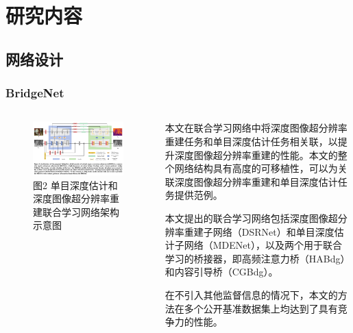 \documentclass[aspectratio=169,12pt]{beamer}
\begin{document}
\section{研究内容}
\subsection{网络设计}
\begin{frame}[t]
	\frametitle{BridgeNet}
	\begin{columns}
		\begin{column}{.50\linewidth}
			\begin{figure}
				\centering
				\includegraphics[scale=0.23]{13.png}
				\caption{\small \color{captiongray}图2 单目深度估计和深度图像超分辨率重建联合学习网络架构示意图}
			\end{figure}
		\end{column}
		\begin{column}{.50\linewidth}
			\begin{itemize}
			{\footnotesize
				\item 本文在{\color{red}联合学习网络}中将深度图像超分辨率重建任务和单目深度估计任务相关联，以提升深度图像超分辨率重建的性能。本文的整个网络结构具有高度的可移植性，可以为关联深度图像超分辨率重建和单目深度估计任务提供范例。
				\item 本文提出的联合学习网络包括深度图像超分辨率重建子网络（DSRNet）和单目深度估计子网络（MDENet），以及{\color{red}两个用于联合学习的桥接器}，即高频注意力桥（HABdg）和内容引导桥（CGBdg）。
				\item 在不引入其他监督信息的情况下，本文的方法在多个公开基准数据集上均达到了{\color{red}具有竞争力的性能}。}
			\end{itemize}		
		\end{column}
	\end{columns}

\end{frame}
\end{document}

